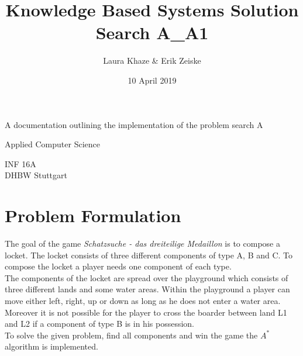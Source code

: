 \documentclass{article}
\title{Knowledge Based Systems Solution Search A\_A1}
\author{Laura Khaze \& Erik Zeiske}
\date{10 April 2019}
\newcommand{\problem}{Schatzsuche - das dreiteilige Medaillon}
\begin{document}
\begin{titlepage}
    \begin{center}
        \vspace*{1cm}
 
        \Huge
        \textbf{\@title}
 
        \vspace{0.5cm}
        \LARGE
        A documentation outlining the implementation of the problem search A
 
        \vspace{1.5cm}
 
        \textbf{\@author}
 
        \vfill
 
        Applied Computer Science
 
 
        INF 16A\\
        DHBW Stuttgart\\
        \@date
 
    \end{center}
\end{titlepage}
\tableofcontents
\newpage
\section{Problem Formulation} \label{problem_formulation}
The goal of the game \textit{\problem} is to compose a locket. The locket consists of three different components of type A, B and C. To compose the locket a player needs one component of each type. \\
The components of the locket are spread over the playground which consists of three different lands and some water areas. Within the playground a player can move either left, right, up or down as long as he does not enter a water area. Moreover it is not possible for the player to cross the boarder between land L1 and L2 if a component of type B is in his possession. \\
To solve the given problem, find all components and win the game the $A^*$ algorithm is implemented. \\
\end{document}
